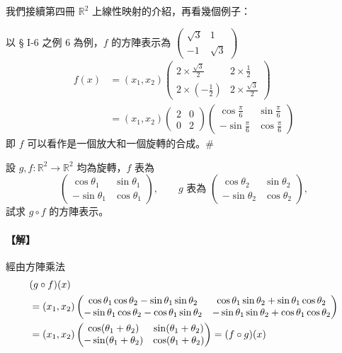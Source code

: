 我們接續第四冊 $\mathbb{R}^2$ 上線性映射的介紹，再看幾個例子：

\begin{example}\label{ex:b6-1-37}
以 § I-6 之例 6 為例，$f$ 的方陣表示為 $\begin{pmatrix} \sqrt{3} & 1 \\ -1 & \sqrt{3} \end{pmatrix}$
\begin{align*}
f(x) &= (x_1, x_2) \begin{pmatrix} 2 \times \frac{\sqrt{3}}{2} & 2 \times \frac{1}{2} \\ 2 \times (-\frac{1}{2}) & 2 \times \frac{\sqrt{3}}{2} \end{pmatrix} \\
&= (x_1, x_2) \begin{pmatrix} 2 & 0 \\ 0 & 2 \end{pmatrix} \begin{pmatrix} \cos\frac{\pi}{6} & \sin\frac{\pi}{6} \\ -\sin\frac{\pi}{6} & \cos\frac{\pi}{6} \end{pmatrix}
\end{align*}
即 $f$ 可以看作是一個放大和一個旋轉的合成。\hfill$\#$
\end{example}

\begin{discussion}\label{disc:b6-1-4}
設 $g, f: \mathbb{R}^2 \longrightarrow \mathbb{R}^2$ 均為旋轉，$f$ 表為
\[ \begin{pmatrix} \cos\theta_1 & \sin\theta_1 \\ -\sin\theta_1 & \cos\theta_1 \end{pmatrix}, \qquad g \text{ 表為 } \begin{pmatrix} \cos\theta_2 & \sin\theta_2 \\ -\sin\theta_2 & \cos\theta_2 \end{pmatrix}, \]
試求 $g \circ f$ 的方陣表示。
\end{discussion}

\paragraph{【解】}
經由方陣乘法
\begin{align}
&(g \circ f)(x) \notag \\
&= (x_1, x_2) \begin{pmatrix}
\cos\theta_1\cos\theta_2 - \sin\theta_1\sin\theta_2 & \cos\theta_1\sin\theta_2 + \sin\theta_1\cos\theta_2 \\
-\sin\theta_1\cos\theta_2 - \cos\theta_1\sin\theta_2 & -\sin\theta_1\sin\theta_2 + \cos\theta_1\cos\theta_2
\end{pmatrix} \notag \\
&= (x_1, x_2) \begin{pmatrix}
\cos(\theta_1+\theta_2) & \sin(\theta_1+\theta_2) \\
-\sin(\theta_1+\theta_2) & \cos(\theta_1+\theta_2)
\end{pmatrix} = (f \circ g)(x) \label{eq:b6-1-7-9}
\end{align}

